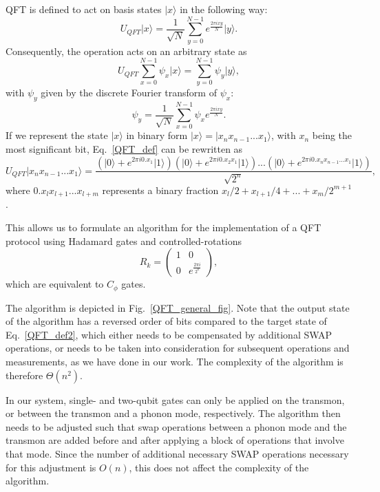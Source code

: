 \documentclass[12pt]{article}
\newcommand{\ket}[1]{\ensuremath{|{#1}\rangle}}
\begin{document}
QFT is defined to act on basis states $\ket{x}$ in the following way:
\begin{equation}
\label{QFT_def}
U_{QFT} \ket{x} = \frac{1}{\sqrt{N}}\sum_{y=0}^{N-1}e^{\frac{2 \pi i x y}{N}} \ket{y}.
\end{equation}
Consequently, the operation acts on an arbitrary state as
\begin{equation}
U_{QFT} \sum_{x=0}^{N-1}\psi_x \ket{x} = \sum_{y=0}^{N-1}\psi_y \ket{y},
\end{equation}
with $\psi_y$ given by the discrete Fourier transform of $\psi_x$:
\begin{equation}
\psi_y = \frac{1}{\sqrt{N}}\sum_{x=0}^{N-1} \psi_x e^{\frac{2 \pi i x y}{N}}.
\end{equation}
If we represent the state $\ket{x}$ in binary form $\ket{x} = \ket{x_nx_{n-1}...x_1}$, with $x_n$ being the most significant bit, Eq.~\ref{QFT_def} can be rewritten as
\begin{equation}
\label{QFT_def2}
U_{QFT} \ket{x_nx_{n-1}...x_1} = \frac{\left( \ket{0} + e^{2\pi i 0.x_1}\ket{1}\right) \left( \ket{0} + e^{2\pi i 0.x_2x_1}\ket{1} \right) ... \left( \ket{0} + e^{2\pi i 0.x_nx_{n-1}...x_1}\ket{1}\right)}{\sqrt{2^n}},
\end{equation}
where $0.x_lx_{l+1}...x_{l+m}$ represents a binary fraction $x_l/2 + x_{l+1}/4 + ... + x_m/2^{m+1}$.

This allows us to formulate an algorithm for the implementation of a QFT protocol using Hadamard gates and controlled-rotations
\begin{equation}
    R_k =\begin{pmatrix}
        1&0\\
        0&e^{\frac{2\pi i}{2^k}}
    \end{pmatrix},
\end{equation}
which are equivalent to $C_{\phi}$ gates.

The algorithm is depicted in Fig.~\ref{QFT_general_fig}. Note that the output state of the algorithm has a reversed order of bits compared to the target state of Eq.~\ref{QFT_def2}, which either needs to be compensated by additional SWAP operations, or needs to be taken into consideration for subsequent operations and measurements, as we have done in our work. The complexity of the algorithm is therefore $\Theta(n^2)$.

In our system, single- and two-qubit gates can only be applied on the transmon, or between the transmon and a phonon mode, respectively. The algorithm then needs to be adjusted such that swap operations between a phonon mode and the transmon are added before and after applying a block of operations that involve that mode. Since the number of additional necessary SWAP operations necessary for this adjustment is $O(n)$, this does not affect the complexity of the algorithm.
\end{document}
